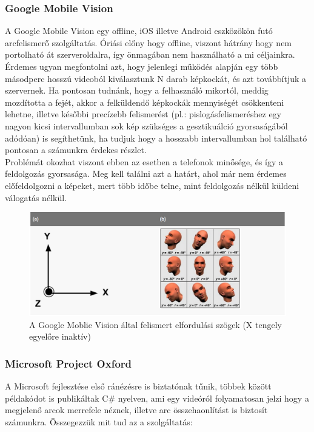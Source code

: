 \subsubsection{Google Mobile Vision}
A Google Mobile Vision\cite{GMV} egy offline, iOS illetve Android eszközökön futó arcfelismerő szolgáltatás. Óriási előny hogy offline, viszont hátrány hogy nem portolható át szerveroldalra, így önmagában nem használható a mi céljainkra. Érdemes ugyan megfontolni azt, hogy jelenlegi működés alapján egy több másodperc hosszú videoból kiválasztunk N darab képkockát, és azt továbbítjuk a szervernek. Ha pontosan tudnánk, hogy a felhasználó mikortól, meddig mozdította a fejét, akkor a felküldendő képkockák mennyiségét csökkenteni lehetne, illetve későbbi precízebb felismerést (pl.: pislogásfelismeréshez egy nagyon kicsi intervallumban sok kép szükséges a gesztikuálció gyorsaságából adódóan) is segíthetünk, ha tudjuk hogy a hosszabb intervallumban hol található pontosan a számunkra érdekes részlet.
\\Problémát okozhat viszont ebben az esetben a telefonok minősége, és így a feldolgozás gyorsasága. Meg kell találni azt a határt, ahol már nem érdemes előfeldolgozni a képeket, mert több időbe telne, mint feldolgozás nélkül küldeni válogatás nélkül.
\begin{figure}[h]
\centering
  \includegraphics[scale=0.5]{img/gmv}
    \caption{A Google Moblie Vision által felismert elfordulási szögek (X tengely egyelőre inaktív)  \cite{GMV_ANGLES}}
\end{figure}

\subsubsection{Microsoft Project Oxford}
A Microsoft fejlesztése első ránézésre is biztatónak tűnik, többek között példakódot is publikáltak C\# nyelven, ami egy videóról folyamatosan jelzi hogy a megjelenő arcok merrefele néznek, illetve arc összehaonlítást is biztosít számunkra. Összegezzük mit tud az a szolgáltatás:

